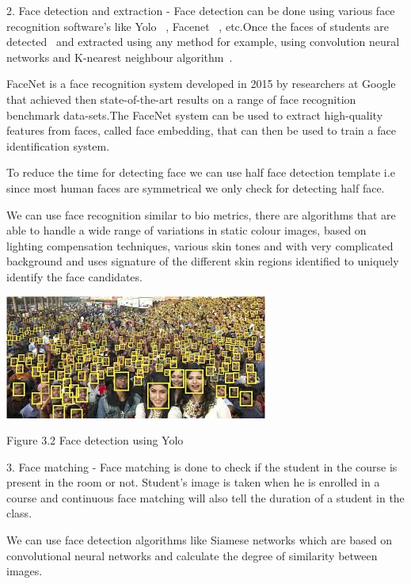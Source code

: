 \documentclass[10pt,twocolumn,letterpaper]{article}
\begin{document}
2. Face detection and extraction -  Face detection can be done using various face recognition software's like Yolo ~\cite{yolo}, Facenet ~\cite{facenet1}, etc.Once the faces of students are detected~\cite{facedetect} and extracted using any method for example, using convolution neural networks and K-nearest neighbour algorithm~\cite{face-detect}.

FaceNet is a face recognition system developed in 2015 by researchers at Google that achieved then state-of-the-art results on a range of face recognition benchmark data-sets.The FaceNet system can be used to extract high-quality features from faces, called face embedding, that can then be used to train a face identification system.~\cite{facenet}

To reduce the time for detecting face we can use half face detection template i.e since most human faces are symmetrical we only check for detecting half face.~\cite{facedetect}

We can use face recognition similar to bio metrics, there are algorithms that are able to handle a wide range of variations in static colour images, based on lighting compensation techniques, various skin tones and with very complicated background and uses signature of the different skin regions identified to uniquely identify the face candidates.~\cite{facedetect2}

\begin{center}
\includegraphics[width=1\linewidth]{img1.jpeg}
\caption{Figure 3.2 Face detection using Yolo}
\end{center}

3. Face matching - Face matching is done to check if the student in the course is present in the room or not. Student's image is taken when he is enrolled in a course and continuous face matching will also tell the duration of a student in the class.

We can use face detection algorithms like Siamese networks which are based on convolutional neural networks and calculate the degree of similarity between images.~\cite{face-matching}
\end{document}
